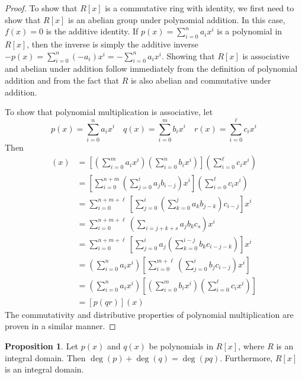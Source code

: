 \documentclass[11pt]{book}
\theoremstyle{definition}\newtheorem{definition}[subsection]{Definition}
\theoremstyle{definition}\newtheorem{example}[subsection]{Example}
\theoremstyle{definition}\newtheorem{notation}[subsection]{Notation}
\theoremstyle{definition}\newtheorem{remark}[subsection]{Remark}
\theoremstyle{theorem}\newtheorem{theorem}[subsection]{Theorem}
\theoremstyle{theorem}\newtheorem{lemma}[subsection]{Lemma}
\theoremstyle{theorem}\newtheorem{proposition}[subsection]{Proposition}
\theoremstyle{theorem}\newtheorem{corollary}[subsection]{Corollary}
\begin{document}
\begin{proof}
    To show that $R[x]$ is a commutative ring with identity, we first need to show that $R[x]$ is an abelian group under polynomial addition. In this case, $f(x) = 0$ is the additive identity. If $p(x) = \sum_{i = 0}^{n} a_ix^i$ is a polynomial in $R[x]$, then the inverse is simply the additive inverse $-p(x) = \sum_{i = 0}^{n} (-a_i)x^i = -\sum_{i = 0}^{n} a_ix^i$. Showing that $R[x]$ is associative and abelian under addition follow immediately from the definition of polynomial addition and from the fact that $R$ is also abelian and commutative under addition.

    To show that polynomial multiplication is associative, let
    \begin{equation*}
        p(x) = \sum_{i = 0}^{n} a_ix^i \quad q(x) = \sum_{i = 0}^{m} b_ix^i \quad r(x) = \sum_{i = 0}^{\ell} c_ix^i
    \end{equation*}
    Then
    \begin{align*}
        [(pq)r](x) &= \left[\left(\sum_{i = 0}^{m} a_ix^i\right)\left(\sum_{i = 0}^{n} b_ix^i\right)\right]\left(\sum_{i = 0}^{\ell} c_ix^i\right) \\
        &= \left[\sum_{i = 0}^{n + m} \left(\sum_{j = 0}^{i} a_jb_{i - j}\right)x^i\right]\left(\sum_{i = 0}^{\ell} c_ix^i\right) \\
        &= \sum_{i = 0}^{n + m + \ell} \left[\sum_{j = 0}^{i} \left(\sum_{k = 0}^{j} a_k b_{j - k}\right)c_{i - j}\right]x^i \\
        &= \sum_{i = 0}^{n + m + \ell} \left(\sum_{i = j + k + s} a_j b_k c_s\right)x^i \\
        &= \sum_{i = 0}^{n + m + \ell} \left[\sum_{j = 0}^{i} a_j\left(\sum_{k = 0}^{i - j} b_k c_{i - j - k}\right)\right]x^i \\
        &= \left(\sum_{i = 0}^{n} a_ix^i\right)\left[\sum_{i = 0}^{m + \ell} \left(\sum_{j = 0}^{i} b_j c_{i - j}\right)x^i\right] \\
        &= \left(\sum_{i = 0}^{n} a_ix^i\right)\left[\left(\sum_{i = 0}^{m} b_ix^i\right)\left(\sum_{i = 0}^{\ell} c_ix^i\right)\right] \\
        &= [p(qr)](x)
    \end{align*}
    The commutativity and distributive properties of polynomial multiplication are proven in a similar manner.
\end{proof}

\begin{proposition}\label{proposition:2.1.12}
    Let $p(x)$ and $q(x)$ be polynomials in $R[x]$, where $R$ is an integral domain. Then $\deg(p) + \deg(q) = \deg(pq)$. Furthermore, $R[x]$ is an integral domain.
\end{proposition}
\end{document}
